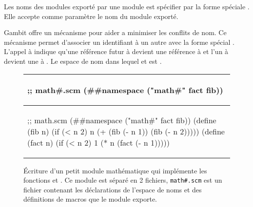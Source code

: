 Les noms des modules exporté par une module est spécifier par la forme
spéciale . Elle accepte comme paramètre le nom
du module exporté.


Gambit offre un mécanisme pour aider a minimiser les conflits de nom. Ce
mécanisme permet d'associer un identifiant à un autre avec la forme spécial
.  L'appel à  indique
qu'une référence futur à  devient une référence à
 et l'un à  devient une à . Le espace
de nom dans lequel  et  est .

\begin{center}
  \begin{figure}[h]
  \begin{tabular}{|l|}
\hline
\begin{mplisting}{0.5}
;; math#.scm
(##namespace ("math#" fact fib))
\end{mplisting} \\\hline
\begin{mplisting}{0.6}
;; math.scm
(##namespace ("math#" fact fib))
(define (fib n)
  (if (< n 2)
    n
    (+ (fib (- n 1)) (fib (- n 2)))))
(define (fact n)
  (if (< n 2)
    1
    (* n (fact (- n 1)))))
\end{mplisting}\\\hline
  \end{tabular}
  \caption{Écriture d'un petit module mathématique qui implémente les fonctions 
    et . Ce module est séparé en 2 fichiers, \texttt{math\#.scm} est un fichier
    contenant les déclarations de l'espace de noms et des définitions de macros que le module
    exporte.}
  \label{fig:math_module1}
\end{figure}
\end{center}

%

